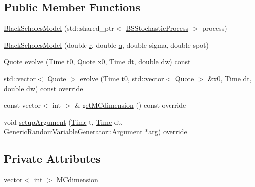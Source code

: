 \subsection*{Public Member Functions}
\begin{DoxyCompactItemize}
\item 
\hyperlink{class_black_scholes_model_a5cc9ce0cdb0f040da65677b2c07f09b5}{Black\+Scholes\+Model} (std\+::shared\+\_\+ptr$<$ \hyperlink{class_b_s_stochastic_process}{B\+S\+Stochastic\+Process} $>$ process)
\item 
\hyperlink{class_black_scholes_model_a59aa736bd849bc59fed035f702e9813b}{Black\+Scholes\+Model} (double \hyperlink{_uniform_l_ecuyer_r_n_g1_8cpp_a372556d73d7e403d9b677b89b21ee572}{r}, double \hyperlink{_uniform_l_ecuyer_r_n_g1_8cpp_a5cf10165494588b84d4231e0e8a5b1a9}{q}, double sigma, double spot)
\item 
\hyperlink{_name_def_8h_a642a6c5fd87319d922637de0e0bb0305}{Quote} \hyperlink{class_black_scholes_model_abcbe5f02a1820adf876b1981c78dc43a}{evolve} (\hyperlink{_name_def_8h_ac2d3e0ba793497bcca555c7c2cf64ff3}{Time} t0, \hyperlink{_name_def_8h_a642a6c5fd87319d922637de0e0bb0305}{Quote} x0, \hyperlink{_name_def_8h_ac2d3e0ba793497bcca555c7c2cf64ff3}{Time} dt, double dw) const
\item 
std\+::vector$<$ \hyperlink{_name_def_8h_a642a6c5fd87319d922637de0e0bb0305}{Quote} $>$ \hyperlink{class_black_scholes_model_ae7ece51fd9f0eac3f77975cff857216d}{evolve} (\hyperlink{_name_def_8h_ac2d3e0ba793497bcca555c7c2cf64ff3}{Time} t0, std\+::vector$<$ \hyperlink{_name_def_8h_a642a6c5fd87319d922637de0e0bb0305}{Quote} $>$ \&x0, \hyperlink{_name_def_8h_ac2d3e0ba793497bcca555c7c2cf64ff3}{Time} dt, double dw) const override
\item 
const vector$<$ int $>$ \& \hyperlink{class_black_scholes_model_a5665e6ea247e4f243082f5c98bbdbad6}{get\+M\+Cdimension} () const override
\item 
void \hyperlink{class_black_scholes_model_a04a6ba4c59cd70a92dedbeb482e9d5aa}{setup\+Argument} (\hyperlink{_name_def_8h_ac2d3e0ba793497bcca555c7c2cf64ff3}{Time} t, \hyperlink{_name_def_8h_ac2d3e0ba793497bcca555c7c2cf64ff3}{Time} dt, \hyperlink{class_generic_random_variable_generator_1_1_argument}{Generic\+Random\+Variable\+Generator\+::\+Argument} $\ast$arg) override
\end{DoxyCompactItemize}
\subsection*{Private Attributes}
\begin{DoxyCompactItemize}
\item 
vector$<$ int $>$ \hyperlink{class_black_scholes_model_a9457c1edc58d9f737f7eeeaaa6812488}{M\+Cdimension\+\_\+}
\end{DoxyCompactItemize}
